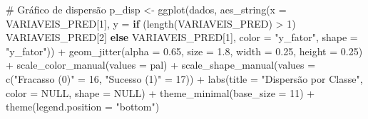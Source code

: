 \documentclass[
  letterpaper,
  DIV=11,
  numbers=noendperiod]{scrartcl}
\newenvironment{Shaded}{\begin{snugshade}}{\end{snugshade}}
\newcommand{\AttributeTok}[1]{\textcolor[rgb]{0.40,0.45,0.13}{#1}}
\newcommand{\CommentTok}[1]{\textcolor[rgb]{0.37,0.37,0.37}{#1}}
\newcommand{\ConstantTok}[1]{\textcolor[rgb]{0.56,0.35,0.01}{#1}}
\newcommand{\ControlFlowTok}[1]{\textcolor[rgb]{0.00,0.23,0.31}{\textbf{#1}}}
\newcommand{\DecValTok}[1]{\textcolor[rgb]{0.68,0.00,0.00}{#1}}
\newcommand{\FloatTok}[1]{\textcolor[rgb]{0.68,0.00,0.00}{#1}}
\newcommand{\FunctionTok}[1]{\textcolor[rgb]{0.28,0.35,0.67}{#1}}
\newcommand{\NormalTok}[1]{\textcolor[rgb]{0.00,0.23,0.31}{#1}}
\newcommand{\OtherTok}[1]{\textcolor[rgb]{0.00,0.23,0.31}{#1}}
\newcommand{\SpecialCharTok}[1]{\textcolor[rgb]{0.37,0.37,0.37}{#1}}
\newcommand{\StringTok}[1]{\textcolor[rgb]{0.13,0.47,0.30}{#1}}
\begin{document}
\begin{Shaded}
\begin{Highlighting}[]
\CommentTok{\# Gráfico de dispersão}
\NormalTok{p\_disp }\OtherTok{\textless{}{-}} \FunctionTok{ggplot}\NormalTok{(dados,}
                 \FunctionTok{aes\_string}\NormalTok{(}\AttributeTok{x =}\NormalTok{ VARIAVEIS\_PRED[}\DecValTok{1}\NormalTok{],}
                             \AttributeTok{y =} \ControlFlowTok{if}\NormalTok{ (}\FunctionTok{length}\NormalTok{(VARIAVEIS\_PRED) }\SpecialCharTok{\textgreater{}} \DecValTok{1}\NormalTok{) VARIAVEIS\_PRED[}\DecValTok{2}\NormalTok{]}
                                 \ControlFlowTok{else}\NormalTok{ VARIAVEIS\_PRED[}\DecValTok{1}\NormalTok{],}
                             \AttributeTok{color =} \StringTok{"y\_fator"}\NormalTok{, }\AttributeTok{shape =} \StringTok{"y\_fator"}\NormalTok{)) }\SpecialCharTok{+}
  \FunctionTok{geom\_jitter}\NormalTok{(}\AttributeTok{alpha =} \FloatTok{0.65}\NormalTok{, }\AttributeTok{size =} \FloatTok{1.8}\NormalTok{, }\AttributeTok{width =} \FloatTok{0.25}\NormalTok{, }\AttributeTok{height =} \FloatTok{0.25}\NormalTok{) }\SpecialCharTok{+}
  \FunctionTok{scale\_color\_manual}\NormalTok{(}\AttributeTok{values =}\NormalTok{ pal) }\SpecialCharTok{+}
  \FunctionTok{scale\_shape\_manual}\NormalTok{(}\AttributeTok{values =} \FunctionTok{c}\NormalTok{(}\StringTok{"Fracasso (0)"} \OtherTok{=} \DecValTok{16}\NormalTok{, }\StringTok{"Sucesso (1)"} \OtherTok{=} \DecValTok{17}\NormalTok{)) }\SpecialCharTok{+}
  \FunctionTok{labs}\NormalTok{(}\AttributeTok{title =} \StringTok{"Dispersão por Classe"}\NormalTok{,}
       \AttributeTok{color =} \ConstantTok{NULL}\NormalTok{, }\AttributeTok{shape =} \ConstantTok{NULL}\NormalTok{) }\SpecialCharTok{+}
  \FunctionTok{theme\_minimal}\NormalTok{(}\AttributeTok{base\_size =} \DecValTok{11}\NormalTok{) }\SpecialCharTok{+}
  \FunctionTok{theme}\NormalTok{(}\AttributeTok{legend.position =} \StringTok{"bottom"}\NormalTok{)}


\end{Highlighting}
\end{Shaded}
\end{document}
